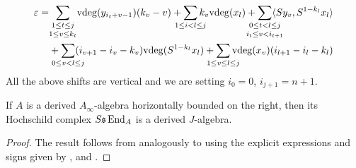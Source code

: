 \documentclass[Thesis.tex]{subfiles}
\begin{document}
\begin{defin}
\begin{align*}
\varepsilon =&\underset{1\leq v\leq k_t}{\sum_{\mathclap{1\leq t\leq j}}} \vdeg(y_{i_t+v-1})(k_v-v)+ \sum_{\mathclap{1\leq i< l\leq j}}k_v\vdeg(x_l)+\underset{\mathclap{i_{t}\leq v< i_{t+1}}}{\sum_{\mathclap{0\leq t< l\leq j}}}\langle Sy_v,S^{1-k_l}x_l\rangle\\
&+\sum_{\mathclap{0\leq v<l\leq j}}(i_{v+1}-i_v-k_v)\vdeg(S^{1-k_l}x_l)+\sum_{\mathclap{1\leq v\leq l\leq j}} \vdeg(x_v)(i_{l+1}-i_l-k_l)
\end{align*}
All the above shifts are vertical and we are setting $i_0=0$, $i_{j+1}=n+1$. 
\end{defin}

\begin{corollary}\label{dainftydeligne}
If $A$ is a derived $A_\infty$-algebra horizontally bounded on the right, then its Hochschild complex $S\mathfrak{s}\operatorname{End}_A$ is a derived $J$-algebra.
\end{corollary}
\begin{proof}
The result follows from  analogously to  using the explicit expressions and signs given by ,  and .
\end{proof}
\end{document}
